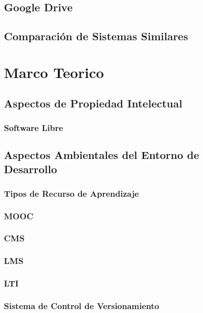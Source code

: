 \subsection{Google Drive}
\subsection{Comparación de Sistemas Similares}

\section{Marco Teorico}

\subsection{Aspectos de Propiedad Intelectual}

\subsubsection{Software Libre}

\subsection{Aspectos Ambientales del Entorno de Desarrollo}

\subsubsection{Tipos de Recurso de Aprendizaje}

\subsubsection{MOOC}
\subsubsection{CMS}
\subsubsection{LMS}
\subsubsection{LTI}

\subsubsection{Sistema de Control de Versionamiento}

